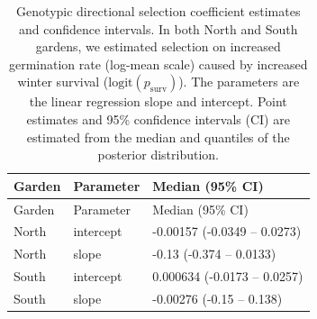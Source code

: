 \documentclass[
  12pt,
]{article}
\begin{document}
\begin{longtable}[]{@{}lll@{}}
\caption{\label{tab:df_ind_lm} Genotypic directional selection coefficient estimates and confidence intervals. In both North and South gardens, we estimated selection on increased germination rate (log-mean scale) caused by increased winter survival (\(\text{logit}(p_\text{surv})\)). The parameters are the linear regression slope and intercept. Point estimates and 95\% confidence intervals (CI) are estimated from the median and quantiles of the posterior distribution.}\tabularnewline
\toprule
Garden & Parameter & Median (95\% CI) \\
\midrule
\endfirsthead
\toprule
Garden & Parameter & Median (95\% CI) \\
\midrule
\endhead
North & intercept & -0.00157 (-0.0349 -- 0.0273) \\
North & slope & -0.13 (-0.374 -- 0.0133) \\
South & intercept & 0.000634 (-0.0173 -- 0.0257) \\
South & slope & -0.00276 (-0.15 -- 0.138) \\
\bottomrule
\end{longtable}

\clearpage
\end{document}
